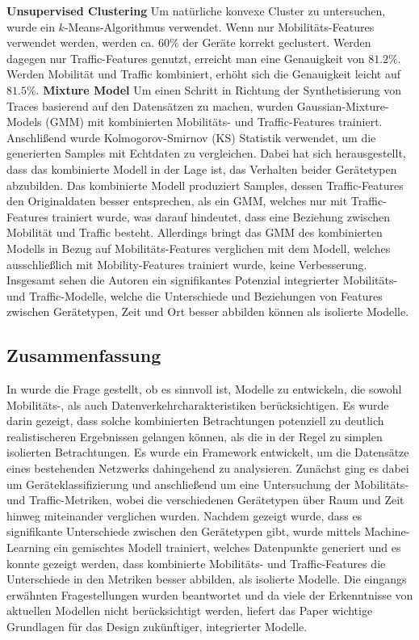 \documentclass[12pt, a4paper]{article}
\begin{document}
\textbf{Unsupervised Clustering}\newline
Um natürliche konvexe Cluster zu untersuchen, wurde ein $k$-Means-Algorithmus verwendet.
Wenn nur Mobilitäts-Features verwendet werden, werden ca. $60 \%$ der Geräte korrekt geclustert.
Werden dagegen nur Traffic-Features genutzt, erreicht man eine Genauigkeit von $81.2 \%$.
Werden Mobilität und Traffic kombiniert, erhöht sich die Genauigkeit leicht auf $81.5 \%$.
\newline\newline
\textbf{Mixture Model}\newline
Um einen Schritt in Richtung der Synthetisierung von Traces basierend auf den Datensätzen zu machen,
wurden Gaussian-Mixture-Models (GMM) mit kombinierten Mobilitäts- und Traffic-Features trainiert.
Anschlißend wurde Kolmogorov-Smirnov (KS) Statistik verwendet, um die generierten Samples mit Echtdaten zu vergleichen.
Dabei hat sich herausgestellt, dass das kombinierte Modell in der Lage ist, das Verhalten beider Gerätetypen abzubilden.
Das kombinierte Modell produziert Samples, dessen Traffic-Features den Originaldaten besser entsprechen, als ein GMM,
welches nur mit Traffic-Features trainiert wurde, was darauf hindeutet, dass eine Beziehung zwischen Mobilität und Traffic besteht.
Allerdings bringt das GMM des kombinierten Modells in Bezug auf Mobilitäts-Features verglichen mit dem Modell, welches 
ausschließlich mit Mobility-Features trainiert wurde, keine Verbesserung.
\newline\newline
Insgesamt sehen die Autoren ein signifikantes Potenzial integrierter Mobilitäts- und Traffic-Modelle, welche die Unterschiede
und Beziehungen von Features zwischen Gerätetypen, Zeit und Ort besser abbilden können als isolierte Modelle.

\subsection{Zusammenfassung}

In \cite{Alipour2018} wurde die Frage gestellt, ob es sinnvoll ist, Modelle zu entwickeln, die sowohl
Mobilitäts-, als auch Datenverkehrcharakteristiken berücksichtigen. Es wurde darin gezeigt, dass solche
kombinierten Betrachtungen potenziell zu deutlich realistischeren Ergebnissen gelangen können,
als die in der Regel zu simplen isolierten Betrachtungen.
Es wurde ein Framework entwickelt, um die Datensätze eines bestehenden Netzwerks dahingehend zu analysieren.
Zunächst ging es dabei um Geräteklassifizierung und anschließend um eine Untersuchung der Mobilitäts-
und Traffic-Metriken, wobei die verschiedenen Gerätetypen über Raum und Zeit hinweg miteinander verglichen wurden.
Nachdem gezeigt wurde, dass es signifikante Unterschiede zwischen den Gerätetypen gibt,
wurde mittels Machine-Learning ein gemischtes Modell trainiert, welches Datenpunkte generiert
und es konnte gezeigt werden, dass kombinierte Mobilitäts- und Traffic-Features die Unterschiede in den
Metriken besser abbilden, als isolierte Modelle. Die eingangs erwähnten Fragestellungen wurden beantwortet
und da viele der Erkenntnisse von aktuellen Modellen nicht berücksichtigt werden, liefert
das Paper wichtige Grundlagen für das Design zukünftiger, integrierter Modelle.
\end{document}
